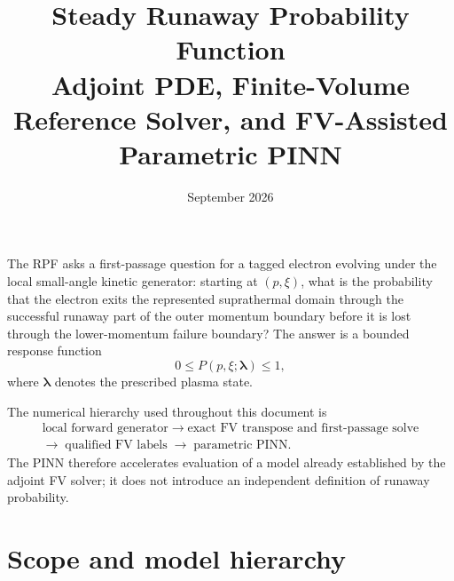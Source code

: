 \documentclass[11pt]{article}
\title{\textbf{Steady Runaway Probability Function}\\[2mm]
Adjoint PDE, Finite-Volume Reference Solver, and FV-Assisted Parametric PINN}
\author{}
\date{September 2026}
\newcommand{\lam}{\bm\lambda}
\begin{document}
\maketitle

\begin{center}
\end{center}

\medskip

The RPF asks a first-passage question for a tagged electron evolving under the local
small-angle kinetic generator: starting at $(p,\xi)$, what is the probability that the
electron exits the represented suprathermal domain through the successful runaway part of
the outer momentum boundary before it is lost through the lower-momentum failure boundary?
The answer is a bounded response function
\begin{equation}
 0\le P(p,\xi;\lam)\le 1,
\end{equation}
where $\lam$ denotes the prescribed plasma state.

The numerical hierarchy used throughout this document is
\begin{equation}
 \boxed{
 \begin{gathered}
 \text{local forward generator}
 \;\longrightarrow\;
 \text{exact FV transpose and first-passage solve}\\
 \longrightarrow\;\text{qualified FV labels}
 \;\longrightarrow\;
 \text{parametric PINN}.
 \end{gathered}
 }
\end{equation}
The PINN therefore accelerates evaluation of a model already established by the adjoint FV
solver; it does not introduce an independent definition of runaway probability.

\tableofcontents
\newpage

\section{Scope and model hierarchy}
\label{sec:scope}
\end{document}
